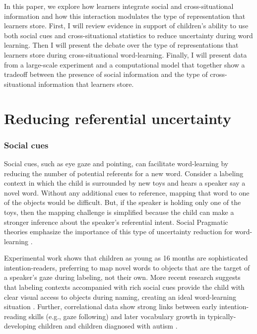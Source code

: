 \documentclass[man]{apa2}
\begin{document}
In this paper, we explore how learners integrate social and cross-situational information and how this interaction modulates the type of representation that learners store. First, I will review evidence in support of children's ability to use both social cues and cross-situational statistics to reduce uncertainty during word learning. Then I will present the debate over the type of representations that learners store during cross-situational word-learning. Finally, I will present data from a large-scale experiment and a computational model that together show a tradeoff between the presence of social information and the type of cross-situational information that learners store.


\section{Reducing referential uncertainty}

\subsubsection{Social cues}

Social cues, such as eye gaze and pointing, can facilitate word-learning by reducing the number of potential referents for a new word.  Consider a labeling context in which the child is surrounded by new toys and hears a speaker say a novel word. Without any additional cues to reference, mapping that word to one of the objects would be difficult. But, if the speaker is holding only one of the toys, then the mapping challenge is simplified because the child can make a stronger inference about the speaker's referential intent. Social Pragmatic theories emphasize the importance of this type of uncertainty reduction for word-learning \cite{bloom2002children, tomasello2009constructing}.

Experimental work shows that children as young as 16 months are sophisticated intention-readers, preferring to map novel words to objects that are the target of a speaker's gaze during labeling, not their own\cite{baldwin1993infants,baldwin2001links}. More recent research suggests that labeling contexts accompanied with rich social cues provide the child with clear visual access to objects during naming, creating an ideal word-learning situation \cite{yu2012embodied}. Further, correlational data show strong links between early intention-reading skills (e.g., gaze following) and later vocabulary growth in typically-developing children \cite{brooks2008infant} and children diagnosed with autism \cite{mundy1990longitudinal}. 
\end{document}
